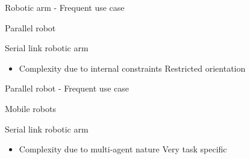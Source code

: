 \documentclass[usenames,dvipsnames,xcolor=table]{beamer}
\begin{document}
\begin{frame}{Robotic arm - Frequent use case}
    \begin{center}
    \end{center}
\end{frame}
\begin{frame}{Parallel robot}
    \begin{center}
        \begin{minipage}{0.49\linewidth}
                \def\svgwidth{0.7\linewidth}
                
        \end{minipage}
        \hfill
        \begin{minipage}{0.49\linewidth}
        \large{Serial link robotic arm}
        \begin{itemize}
            \pro Speed \& precision
            \pro Large 	work-space
            \item[]
            \con Complexity due to internal constraints
            \con Restricted orientation
        \end{itemize}
        \end{minipage}
    \end{center}
\end{frame}

\begin{frame}{Parallel robot - Frequent use case}
    \begin{center}
    \end{center}
\end{frame}
\begin{frame}{Mobile robots}
    \begin{center}
        \begin{minipage}{0.49\linewidth}
                \def\svgwidth{0.85\linewidth}
                
        \end{minipage}
        \hfill
        \begin{minipage}{0.49\linewidth}
        \large{Serial link robotic arm}
        \begin{itemize}
            \pro Increases efficiency in warehouses
            \pro Semi-autonomous systems
            \item[]
            \con Complexity due to multi-agent nature
            \con Very task specific
        \end{itemize}
        \end{minipage}
    \end{center}
\end{frame}
\end{document}
